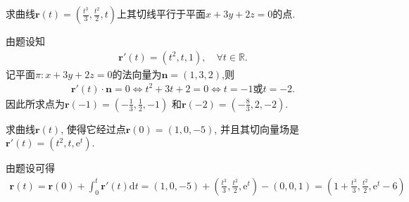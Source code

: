 \documentclass[../../main.tex]{subfiles}%
\begin{document}
\begin{example}
求曲线$\bm{r}(t) = \left(\frac{t^3}{3}, \frac{t^2}{2}, t\right)$上其切线平行于平面$x + 3y + 2z = 0$的点.
\end{example}
\begin{solution}
由题设知
\begin{align*}
\bm{r}'(t)=\left(t^2,t,1\right),\quad \forall t\in \mathbb{R}.
\end{align*}
记平面$\pi:x+3y+2z=0$的法向量为$\bm{n}=(1,3,2)$,则
\begin{align*}
\bm{r}'(t)\cdot \bm{n}=0\Longleftrightarrow t^2+3t+2=0\Longleftrightarrow t=-1\text{或}t=-2.
\end{align*}
因此所求点为$\boldsymbol{r}\left( -1 \right) =\left( -\frac{1}{3},\frac{1}{2},-1 \right)$ 和$\boldsymbol{r}\left( -2 \right) =\left( -\frac{8}{3},2,-2 \right) $.

\end{solution}

\begin{example}
求曲线$\bm{r}(t)$, 使得它经过点$\bm{r}(0) = (1,0,-5)$, 并且其切向量场是$\bm{r}'(t) = (t^2, t, \mathrm{e}^t)$.
\end{example}
\begin{solution}
由题设可得
\begin{align*}
\bm{r}\left( t \right) =\bm{r}\left( 0 \right) +\int_0^t \bm{r}'\left( t \right) \mathrm{d}t=\left( 1,0,-5 \right) +\left( \frac{t^3}{3},\frac{t^2}{2},\mathrm{e}^t \right) -\left( 0,0,1 \right) 
=\left( 1+\frac{t^3}{3},\frac{t^2}{2},\mathrm{e}^t-6 \right)
\end{align*}

\end{solution}
\end{document}
